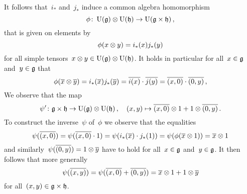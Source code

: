 \begin{example}
\begin{itemize}
      It follows that~$i_*$ and~$j_*$ induce a common algebra homomorphism
      \[
        \phi
        \colon
        \operatorname{U}(\mathfrak{g}) \otimes \operatorname{U}(\mathfrak{h})
        \to
        \operatorname{U}(\mathfrak{g} \times \mathfrak{h}) \,,
      \]
      that is given on elements by
      \[
        \phi(x \otimes y)
        =
        i_*(x) j_*(y)
      \]
      for all simple tensors~$x \otimes y \in \operatorname{U}(\mathfrak{g}) \otimes \operatorname{U}(\mathfrak{h})$.
      It holds in particular for all~$x \in \mathfrak{g}$ and~$y \in \mathfrak{g}$ that
      \[
        \phi(\overline{x} \otimes \overline{y})
        =
        i_*(\overline{x}) j_*(\overline{y})
        =
        \overline{i(x)} \cdot \overline{j(y)}
        =
        \overline{(x,0)} \cdot \overline{(0,y)}  \,,
      \]
      We observe that the map
      \[
        \psi'
        \colon
        \mathfrak{g} \times \mathfrak{h}
        \to
        \operatorname{U}(\mathfrak{g}) \otimes \operatorname{U}(\mathfrak{h}) \,,
        \quad
        (x,y)
        \mapsto
        \overline{(x,0)} \otimes 1 + 1 \otimes \overline{(0,y)} \,.
      \]
      To construct the inverse~$\psi$ of~$\phi$ we observe that the equalities
      \[
        \psi( \overline{(x,0)} )
        =
        \psi( \overline{(x,0)} \cdot 1 )
        =
        \psi( i_*(\overline{x}) \cdot j_*(1) )
        =
        \psi( \phi(\overline{x} \otimes 1) )
        =
        \overline{x} \otimes 1
      \]
      and similarly~$\psi( \overline{(0,y)} ) = 1 \otimes \overline{y}$ have to hold for all~$x \in \mathfrak{g}$ and~$y \in \mathfrak{g}$.
      It then follows that more generally
      \[
        \psi( \overline{(x,y)} )
        =
        \psi( \overline{(x,0)} + \overline{(0,y)} )
        =
        \overline{x} \otimes 1 + 1 \otimes \overline{y}
      \]
      for all~$(x,y) \in \mathfrak{g} \times \mathfrak{h}$.
      

\end{itemize}
\end{example}
